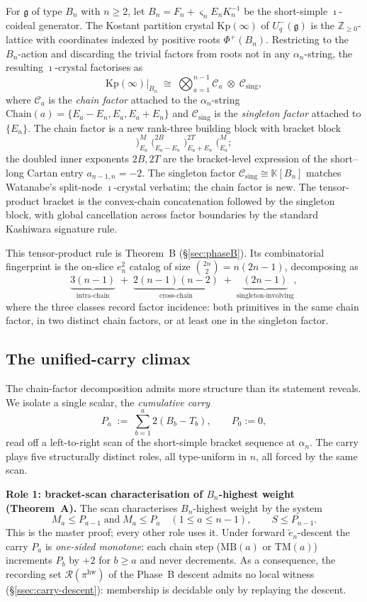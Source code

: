 \documentclass[11pt]{article}
\theoremstyle{definition}
\theoremstyle{remark}
\newcommand{\Kp}{\mathrm{Kp}}
\newcommand{\Chain}{\mathrm{Chain}}
\newcommand{\MB}{\mathrm{MB}}
\newcommand{\TM}{\mathrm{TM}}
\newcommand{\KK}{\mathbb{K}}
\newcommand{\Z}{\mathbb{Z}}
\newcommand{\Zn}{\Z_{\geq 0}}
\newcommand{\g}{\mathfrak{g}}
\newcommand{\Uqm}{U_q^-(\g)}
\newcommand{\Cmid}{\mathcal{C}}
\newcommand{\Csing}{\mathcal{C}_{\mathrm{sing}}}
\newcommand{\labr}[1]{{)}_{#1}}
\newcommand{\labl}[1]{{(}_{#1}}
\newcommand{\hw}{\mathrm{hw}}
\newcommand{\Rec}{\mathcal{R}}
\begin{document}
For $\g$ of type $B_n$ with $n \geq 2$, let $B_n = F_n + \varsigma_n E_n K_n^{-1}$ be the
short-simple $\imath$-coideal generator. The Kostant partition crystal $\Kp(\infty)$ of $\Uqm$
is the $\Zn$-lattice with coordinates indexed by positive roots $\Phi^+(B_n)$. Restricting to
the $B_n$-action and discarding the trivial factors from roots not in any $\alpha_n$-string,
the resulting $\imath$-crystal factorises as
\[
   \Kp(\infty)|_{B_n} \;\cong\; \bigotimes_{a = 1}^{n - 1} \Cmid_a \;\otimes\; \Csing,
\]
where $\Cmid_a$ is the \emph{chain factor} attached to the $\alpha_n$-string $\Chain(a) = \{E_a
- E_n, E_a, E_a + E_n\}$ and $\Csing$ is the \emph{singleton factor} attached to $\{E_n\}$.
The chain factor is a new rank-three building block with bracket block
\[
   \labr{E_a}^M\; \labl{E_a - E_n}^{2B}\; \labr{E_a + E_n}^{2T}\; \labl{E_a}^M;
\]
the doubled inner exponents $2B, 2T$ are the bracket-level expression of the short--long
Cartan entry $a_{n - 1, n} = -2$. The singleton factor $\Csing \cong \KK[B_n]$ matches
Watanabe's split-node $\imath$-crystal verbatim; the chain factor is new. The tensor-product
bracket is the convex-chain concatenation followed by the singleton block, with global
cancellation across factor boundaries by the standard Kashiwara signature rule.

This tensor-product rule is Theorem~B (\S\ref{sec:phaseB}). Its combinatorial fingerprint is
the on-slice $e_n^2$ catalog of size $\binom{2n}{2} = n(2n - 1)$, decomposing as
\[
\underbrace{3(n-1)}_{\text{intra-chain}} \;+\; \underbrace{2(n-1)(n-2)}_{\text{cross-chain}} \;+\;
\underbrace{(2n-1)}_{\text{singleton-involving}},
\]
where the three classes record factor incidence: both primitives in the same chain factor,
in two distinct chain factors, or at least one in the singleton factor.

\subsection{The unified-carry climax}\label{ssec:carry-climax}

The chain-factor decomposition admits more structure than its statement reveals. We isolate a
single scalar, the \emph{cumulative carry}
\[
   P_a \;:=\; \sum_{b = 1}^{a} 2(B_b - T_b), \qquad P_0 := 0,
\]
read off a left-to-right scan of the short-simple bracket sequence at $\alpha_n$. The carry
plays five structurally distinct roles, all type-uniform in $n$, all forced by the same scan.

\medskip
\noindent\textbf{Role 1: bracket-scan characterisation of $B_n$-highest weight (Theorem~A).}
The scan characterises $B_n$-highest weight by the system
\[
   M_a \le P_{a - 1} \;\text{and}\; M_a \le P_a \quad (1 \le a \le n - 1), \qquad S \le P_{n - 1}.
\]
This is the master proof; every other role uses it. Under forward $\widetilde{e}_n$-descent
the carry $P_a$ is \emph{one-sided monotone}: each chain step ($\MB(a)$ or $\TM(a)$)
increments $P_b$ by $+2$ for $b \ge a$ and never decrements. As a consequence, the recording
set $\Rec(\pi^{\hw})$ of the Phase~B descent admits no local witness
(\S\ref{ssec:carry-descent}): membership is decidable only by replaying the descent.
\end{document}
